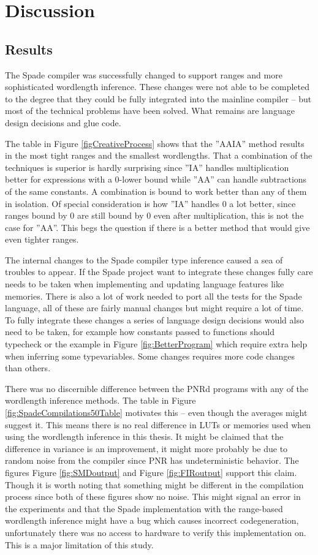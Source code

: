 \chapter{Discussion}
\label{cha:Discussion}

\section{Results}
The Spade compiler was successfully changed to support ranges and more sophisticated wordlength inference. These changes were not able to be completed to the degree that they could be fully integrated into the mainline compiler -- but most of the technical problems have been solved. What remains are language design decisions and glue code.

The table in Figure \ref{figCreativeProcess} shows that the ''AAIA'' method results in the most tight ranges and the smallest wordlengths. That a combination of the techniques is superior is hardly surprising since ''IA'' handles multiplication better for expressions with a 0-lower bound while ''AA'' can handle subtractions of the same constants. A combination is bound to work better than any of them in isolation. Of special consideration is how ''IA'' handles $0$ a lot better, since ranges bound by 0 are still bound by $0$ even after multiplication, this is not the case for ''AA''. This begs the question if there is a better method that would give even tighter ranges.

The internal changes to the Spade compiler type inference caused a sea of troubles to appear. If the Spade project want to integrate these changes fully care needs to be taken when implementing and updating language features like memories. There is also a lot of work needed to port all the tests for the Spade language, all of these are fairly manual changes but might require a lot of time. To fully integrate these changes a series of language design decisions would also need to be taken, for example how constants passed to functions should typecheck or the example in Figure \ref{fig:BetterProgram} which require extra help when inferring some typevariables. Some changes requires more code changes than others.

There was no discernible difference between the PNRd programs with any of the wordlength inference methods. The table in Figure \ref{fig:SpadeCompilations50Table} motivates this -- even though the averages might suggest it. This means there is no real difference in LUTs or memories used when using the wordlength inference in this thesis. It might be claimed that the difference in variance is an improvement, it might more probably be due to random noise from the compiler since PNR has undeterministic behavior. The figures Figure \ref{fig:SMDoutput} and Figure \ref{fig:FIRoutput} support this claim. Though it is worth noting that something might be different in the compilation process since both of these figures show no noise. This might signal an error in the experiments and that the Spade implementation with the range-based wordlength inference might have a bug which causes incorrect codegeneration, unfortunately there was no access to hardware to verify this implementation on. This is a major limitation of this study.

